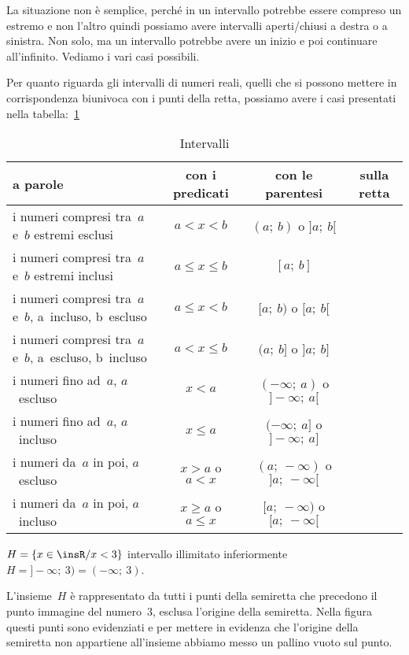 La situazione non è semplice, perché in un intervallo potrebbe essere compreso 
un estremo e non l'altro quindi possiamo avere intervalli aperti/chiusi
a destra o a sinistra. Non solo, ma un intervallo potrebbe avere un inizio
e poi continuare all'infinito. Vediamo i vari casi possibili.

Per quanto riguarda gli intervalli di numeri reali, quelli che si possono
mettere in corrispondenza biunivoca con i punti della retta, possiamo avere 
i casi presentati nella tabella:~\ref{tab:intervalli}

\begin{table}[h!]
\caption{Intervalli}
\center
\label{tab:intervalli}
 \begin{tabular}{p{4cm}|c|c|c}
  a parole   & con i predicati & con le parentesi & sulla retta \\
  \hline
  i numeri compresi tra~$a$ e~$b$ estremi esclusi & 
  $a < x < b$ & $(a;~b)$ o $]a;~b[$ & 
   \\
  \hline
  i numeri compresi tra~$a$ e~$b$ estremi inclusi & 
  $a \le x \le b$ & $[a;~b]$ & 
   \\
  \hline
  i numeri compresi tra~$a$ e~$b$, a~incluso, b~escluso & 
  $a \le x < b$ & $[a;~b)$ o $[a;~b[$ & 
   \\
  \hline
  i numeri compresi tra~$a$ e~$b$, a~escluso, b~incluso & 
  $a < x \le b$ & $(a;~b]$ o $]a;~b]$ & 
   \\
  \hline
  i numeri fino ad~$a$, $a$~escluso & 
  $x < a$ & $(-\infty;~a)$ o $]-\infty;~a[$ & 
   \\
  \hline
  i numeri fino ad~$a$, $a$~incluso & 
  $x \le a$ & $(-\infty;~a]$ o $]-\infty;~a]$ & 
   \\
  \hline
  i numeri da~$a$ in poi, $a$~escluso & 
  $x > a$ o $a < x$ & $(a;~-\infty)$ o $]a;~-\infty[$ & 
   \\
  \hline
  i numeri da~$a$ in poi, $a$~incluso & 
  $x \ge a$ o $a \le x$ & $[a;~-\infty)$ o $[a;~-\infty[$ & 
   
 \end{tabular}
\end{table}

\begin{esempio}
$H=\{x\in \insR/x<3\}$ intervallo illimitato 
inferiormente~$H = ]-\infty;~3) = (-\infty;~3)$.

L'insieme~$H$ è rappresentato da tutti i punti della
semiretta che precedono il punto immagine del numero~3, esclusa
l'origine della semiretta. Nella figura questi punti sono evidenziati e 
per mettere in evidenza che l'origine della semiretta non
appartiene all'insieme abbiamo messo un pallino vuoto sul punto.
\begin{center}
 
\end{center}
\end{esempio}

